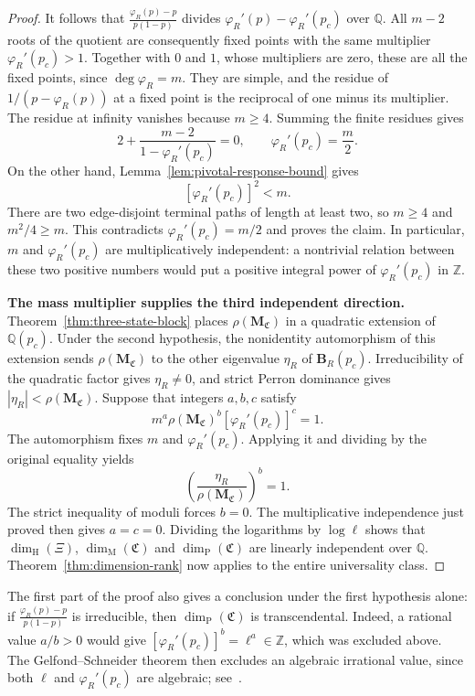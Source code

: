 \documentclass[scheme=plain,11pt]{ctexart}
\theoremstyle{definition}
\theoremstyle{remark}
\newcommand{\dimhaus}{\dim_{\mathrm H}}
\newcommand{\dimmass}{\dim_{\mathrm M}}
\begin{document}
\begin{proof}
It follows that $\frac{\varphi_R(p)-p}{p(1-p)}$ divides $\varphi_R'(p)-\varphi_R'(p_c)$ over $\mathbb Q$.
All $m-2$ roots of the quotient are consequently fixed points with the same multiplier $\varphi_R'(p_c)>1$.
Together with $0$ and $1$, whose multipliers are zero, these are all the fixed points, since $\deg\varphi_R=m$.
They are simple, and the residue of $1/(p-\varphi_R(p))$ at a fixed point is the reciprocal of one minus its multiplier.
The residue at infinity vanishes because $m\ge4$.
Summing the finite residues gives
\[
 2+\frac{m-2}{1-\varphi_R'(p_c)}=0,
 \qquad \varphi_R'(p_c)=\frac m2.
\]
On the other hand, Lemma~\ref{lem:pivotal-response-bound} gives
\[
 [\varphi_R'(p_c)]^2<m.
\]
There are two edge-disjoint terminal paths of length at least two, so $m\ge4$ and $m^2/4\ge m$.
This contradicts $\varphi_R'(p_c)=m/2$ and proves the claim.
In particular, $m$ and $\varphi_R'(p_c)$ are multiplicatively independent: a nontrivial relation between these two positive numbers would put a positive integral power of $\varphi_R'(p_c)$ in $\mathbb Z$.

\textbf{The mass multiplier supplies the third independent direction.}
Theorem~\ref{thm:three-state-block} places $\rho(\mathbf M_{\mathfrak C})$ in a quadratic extension of $\mathbb Q(p_c)$.
Under the second hypothesis, the nonidentity automorphism of this extension sends $\rho(\mathbf M_{\mathfrak C})$ to the other eigenvalue $\eta_R$ of $\mathbf B_R(p_c)$.
Irreducibility of the quadratic factor gives $\eta_R\ne0$, and strict Perron dominance gives $|\eta_R|<\rho(\mathbf M_{\mathfrak C})$.
Suppose that integers $a,b,c$ satisfy
\[
 m^a\rho(\mathbf M_{\mathfrak C})^b[\varphi_R'(p_c)]^c=1.
\]
The automorphism fixes $m$ and $\varphi_R'(p_c)$.
Applying it and dividing by the original equality yields
\[
 \left(\frac{\eta_R}{\rho(\mathbf M_{\mathfrak C})}\right)^b=1.
\]
The strict inequality of moduli forces $b=0$.
The multiplicative independence just proved then gives $a=c=0$.
Dividing the logarithms by $\log\ell$ shows that $\dimhaus(\Xi)$, $\dimmass(\mathfrak C)$ and $\dim_{\mathrm P}(\mathfrak C)$ are linearly independent over $\mathbb Q$.
Theorem~\ref{thm:dimension-rank} now applies to the entire universality class.
\end{proof}

The first part of the proof also gives a conclusion under the first hypothesis alone: if $\frac{\varphi_R(p)-p}{p(1-p)}$ is irreducible, then $\dim_{\mathrm P}(\mathfrak C)$ is transcendental.
Indeed, a rational value $a/b>0$ would give $[\varphi_R'(p_c)]^b=\ell^a\in\mathbb Z$, which was excluded above.
The Gelfond--Schneider theorem then excludes an algebraic irrational value, since both $\ell$ and $\varphi_R'(p_c)$ are algebraic; see~\cite{dasgupta2021transcendence}.
\end{document}
